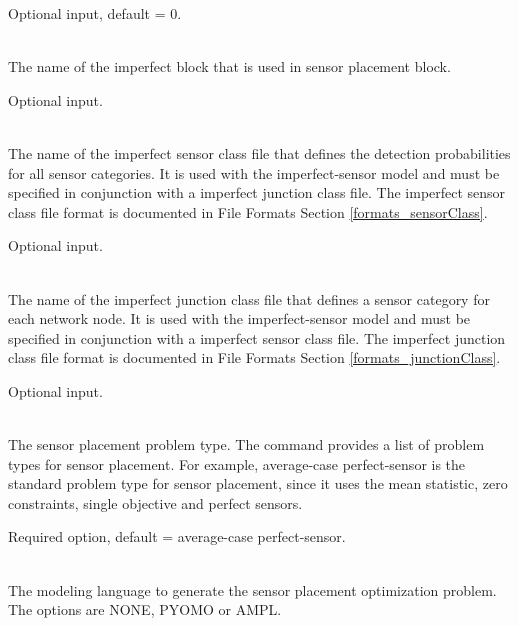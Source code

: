 \begin{description}[topsep=0pt,parsep=0.5em,itemsep=-0.4em]
\begin{description}[topsep=0pt,parsep=0.5em,itemsep=-0.4em]
                Optional input, default = 0.
  \end{description}
  \item[{imperfect}]\hfill
  \begin{description}[topsep=0pt,parsep=0.5em,itemsep=-0.4em]
    \item[{name}]\hfill
\\The name of the imperfect block that is used in sensor placement block.
                
                Optional input.
    \item[{sensor class file}]\hfill
\\The name of the imperfect sensor class file that defines the detection probabilities
                for all sensor categories. It is used with the imperfect-sensor model 
                and must be specified in conjunction with a imperfect junction class file.
                The imperfect sensor class file format is documented in File Formats Section \ref{formats_sensorClass}.
                
                Optional input.
    \item[{junction class file}]\hfill
\\The name of the imperfect junction class file that defines a sensor category for
                each network node. It is used with the imperfect-sensor model and
                must be specified in conjunction with a imperfect sensor class file.
                The imperfect junction class file format is documented in File Formats Section \ref{formats_junctionClass}.
                
                Optional input.
  \end{description}
  \item[{sensor placement}]\hfill
  \begin{description}[topsep=0pt,parsep=0.5em,itemsep=-0.4em]
    \item[{type}]\hfill
\\The sensor placement problem type. The command  
                provides a list of problem types for sensor placement. For example, average-case perfect-sensor
                is the standard problem type for sensor placement, since it uses the mean statistic, 
                zero constraints, single objective and perfect sensors. 
                
                Required option, default = average-case perfect-sensor.
    \item[{modeling language}]\hfill
\\The modeling language to generate the sensor placement optimization 
                problem. The options are NONE, PYOMO or AMPL. 


\end{description}
\end{description}
